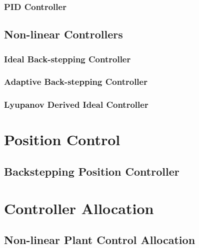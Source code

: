 \subsubsection{PID Controller}
\subsection{Non-linear Controllers}
\label{subsec:control.attitude.nonlinear}
\subsubsection{Ideal Back-stepping Controller}
\subsubsection{Adaptive Back-stepping Controller}
\subsubsection{Lyupanov Derived Ideal Controller}

\section{Position Control}
\label{sec:control.position}
\subsection{Backstepping Position Controller}
\label{subsec:control.position.bacstepping}

\section{Controller Allocation}
\label{ch:control.allocation}
\subsection{Non-linear Plant Control Allocation}
\label{subsec:control.allocation.allocators}
